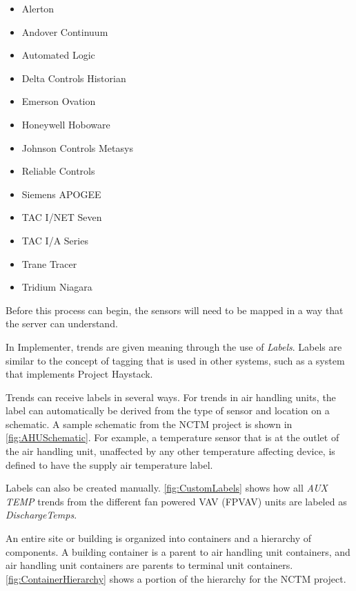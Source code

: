 \begin{itemize}
    \item Alerton
    \item Andover Continuum
    \item Automated Logic
    \item Delta Controls Historian
    \item Emerson Ovation
    \item Honeywell Hoboware
    \item Johnson Controls Metasys
    \item Reliable Controls
    \item Siemens APOGEE
    \item TAC I/NET Seven
    \item TAC I/A Series
    \item Trane Tracer
    \item Tridium Niagara 
\end{itemize}

Before this process can begin, the sensors will need to be mapped in a
way that the server can understand. 

In Implementer, trends are given meaning through the use of
\textit{Labels}. Labels are similar to the concept of tagging that is used
in other systems, such as a system that implements Project Haystack. 

Trends can receive labels in several ways. For trends in air handling
units, the label can automatically be derived from the type of sensor and
location on a schematic. A sample schematic from the NCTM project is
shown in \figref{} \ref{fig:AHUSchematic}. For example, a temperature
sensor that is at the outlet of the air handling unit, unaffected by any
other temperature affecting device, is defined to have the supply air
temperature label. 

Labels can also be created manually. \figref{} \ref{fig:CustomLabels}
shows how all \textit{AUX TEMP} trends from the different fan powered
VAV (FPVAV) units are labeled as \textit{DischargeTemps}.

An entire site or building is organized into containers and a
hierarchy of components. A building container is a parent to air
handling unit containers, and air handling unit containers are parents
to terminal unit containers. \figref{} \ref{fig:ContainerHierarchy}
shows a portion of the hierarchy for the NCTM project.

